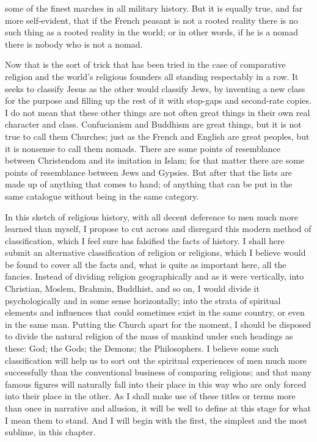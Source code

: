 some of the finest marches in all military history. But it is equally true, and far more self-evident, that if the French peasant is not a rooted reality there is no such thing as a rooted reality in the world; or in other words, if he is a nomad there is nobody who is not a nomad.

Now that is the sort of trick that has been tried in the case of comparative religion and the world's religious founders all standing respectably in a row. It seeks to classify Jesus as the other would classify Jews, by inventing a new class for the purpose and filling up the rest of it with stop-gaps and second-rate copies. I do not mean that these other things are not often great things in their own real character and class. Confucianism and Buddhism are great things, but it is not true to call them Churches; just as the French and English are great peoples, but it is nonsense to call them nomads. There are some points of resemblance between Christendom and its imitation in Islam; for that matter there are some points of resemblance between Jews and Gypsies. But after that the lists are made up of anything that comes to hand; of anything that can be put in the same catalogue without being in the same category.

In this sketch of religious history, with all decent deference to men much more learned than myself, I propose to cut across and disregard this modern method of classification, which I feel sure has falsified the facts of history. I shall here submit an alternative classification of religion or religions, which I believe would be found to cover all the facts and, what is quite as important here, all the fancies. Instead of dividing religion geographically and as it were vertically, into Christian, Moslem, Brahmin, Buddhist, and so on, I would divide it psychologically and in some sense horizontally; into the strata of spiritual elements and influences that could sometimes exist in the same country, or even in the same man. Putting the Church apart for the moment, I should be disposed to divide the natural religion of the mass of mankind under such headings as these: God; the Gods; the Demons; the Philosophers. I believe some such classification will help us to sort out the spiritual experiences of men much more successfully than the conventional business of comparing religions; and that many famous figures will naturally fall into their place in this way who are only forced into their place in the other. As I shall make use of these titles or terms more than once in narrative and allusion, it will be well to define at this stage for what I mean them to stand. And I will begin with the first, the simplest and the most sublime, in this chapter.

